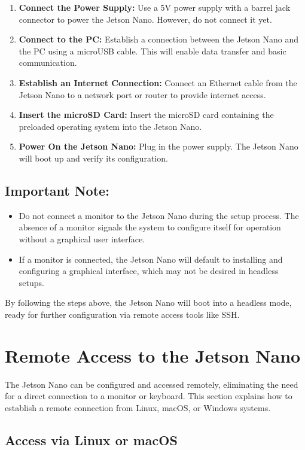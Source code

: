 \begin{enumerate}
	\item \textbf{Connect the Power Supply:} Use a 5V power supply with a barrel jack connector to power the Jetson Nano. However, do not connect it yet.
	\item \textbf{Connect to the PC:} Establish a connection between the Jetson Nano and the PC using a microUSB cable. This will enable data transfer and basic communication.
	\item \textbf{Establish an Internet Connection:} Connect an Ethernet cable from the Jetson Nano to a network port or router to provide internet access.
	\item \textbf{Insert the microSD Card:} Insert the microSD card containing the preloaded operating system into the Jetson Nano.
	\item \textbf{Power On the Jetson Nano:} Plug in the power supply. The Jetson Nano will boot up and verify its configuration.
\end{enumerate}

\subsection{Important Note:}
\begin{itemize}
	\item Do not connect a monitor to the Jetson Nano during the setup process. The absence of a monitor signals the system to configure itself for operation without a graphical user interface.
	\item If a monitor is connected, the Jetson Nano will default to installing and configuring a graphical interface, which may not be desired in headless setups.
\end{itemize}

By following the steps above, the Jetson Nano will boot into a headless mode, ready for further configuration via remote access tools like SSH.



\section{Remote Access to the Jetson Nano}

The Jetson Nano can be configured and accessed remotely, eliminating the need for a direct connection to a monitor or keyboard. This section explains how to establish a remote connection from Linux, macOS, or Windows systems.

\subsection{Access via Linux or macOS}

